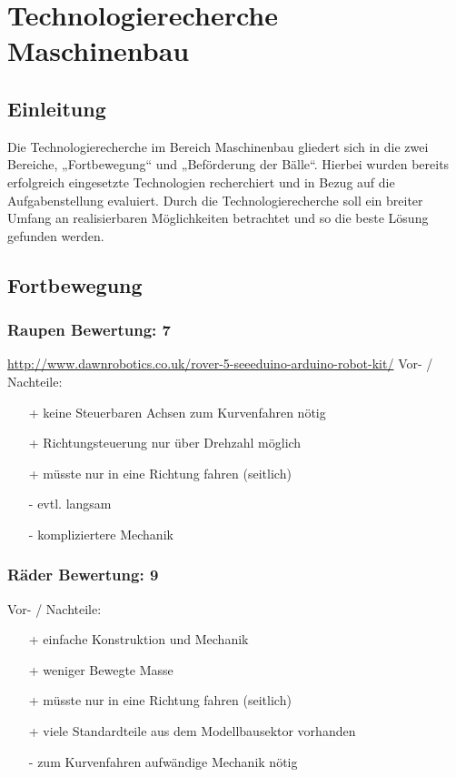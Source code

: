 \section{Technologierecherche Maschinenbau}

\subsection{Einleitung}
Die Technologierecherche im Bereich Maschinenbau gliedert sich in die zwei 
Bereiche, „Fortbewegung“ und  „Beförderung der Bälle“. Hierbei wurden bereits 
erfolgreich eingesetzte Technologien recherchiert und in Bezug auf die 
Aufgabenstellung evaluiert. Durch die Technologierecherche soll ein breiter 
Umfang an realisierbaren Möglichkeiten betrachtet und so die beste Lösung 
gefunden werden.

\subsection{Fortbewegung}

\subsubsection{Raupen \hfill Bewertung: 7}
\url{http://www.dawnrobotics.co.uk/rover-5-seeeduino-arduino-robot-kit/}
Vor- / Nachteile:
\begin{itemize}
    \item[+] keine Steuerbaren Achsen zum Kurvenfahren nötig 
    \item[+] Richtungsteuerung nur über Drehzahl möglich
    \item[+] müsste nur in eine Richtung fahren (seitlich)
    \item[-] evtl. langsam
    \item[-] kompliziertere Mechanik
\end{itemize}

\subsubsection{Räder \hfill Bewertung: 9}
Vor- / Nachteile:
\begin{itemize}
    \item[+] einfache Konstruktion und Mechanik
    \item[+] weniger Bewegte Masse
    \item[+] müsste nur in eine Richtung fahren (seitlich)
    \item[+] viele Standardteile aus dem Modellbausektor vorhanden
    \item[-] zum Kurvenfahren aufwändige Mechanik nötig
\end{itemize}

